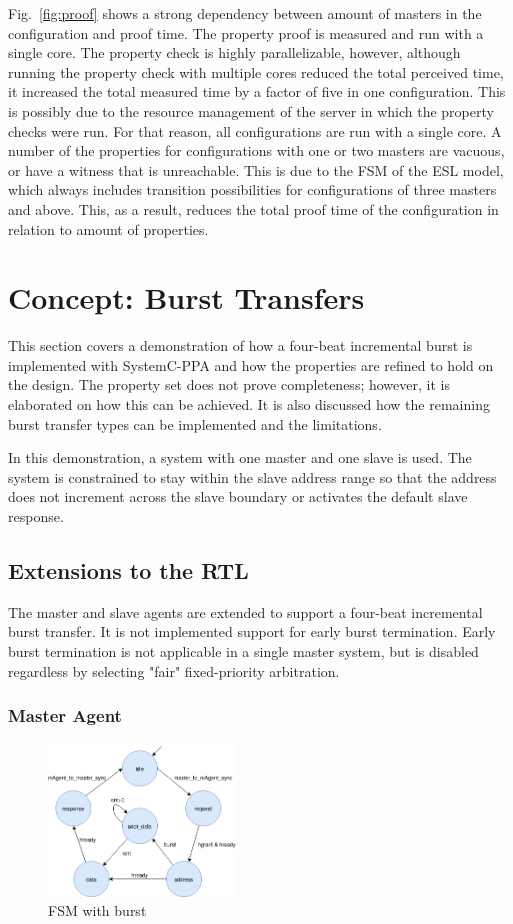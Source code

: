 Fig.~\ref{fig:proof} shows a strong dependency between amount of masters in the configuration and proof time. The property proof is measured and run with a single core. The property check is highly parallelizable, however, although running the property check with multiple cores reduced the total perceived time, it increased the total measured time by a factor of five in one configuration. This is possibly due to the resource management of the server in which the property checks were run. For that reason, all configurations are run with a single core. A number of the properties for configurations with one or two masters are vacuous, or have a witness that is unreachable. This is due to the FSM of the ESL model, which always includes transition possibilities for configurations of three masters and above. This, as a result, reduces the total proof time of the configuration in relation to amount
of properties.
\section{Concept: Burst Transfers}
\label{sec:burst}
This section covers a demonstration of how a four-beat incremental burst is implemented with SystemC-PPA and how the properties are refined to hold on the design.
The property set does not prove completeness; however, it is elaborated on how this can be achieved. It is also discussed how the remaining burst transfer types can be implemented and the limitations. \par
In this demonstration, a system with one master and one slave is used. The system is constrained to stay within the slave address range so that the address does not increment across the slave boundary or activates the default slave response. 

\subsection{Extensions to the RTL}
The master and slave agents are extended to support a four-beat incremental burst transfer. It is not implemented support for early burst termination. Early burst termination is not applicable in a single master system, but is disabled regardless by selecting "fair" fixed-priority arbitration.  
 
\subsubsection{Master Agent}
\begin{figure}
\includegraphics[width=5cm]{figs/hw/mAgent_burstfsm.png}
\caption{FSM with burst}\label{fig:magt-burstfsm}
\end{figure} 

